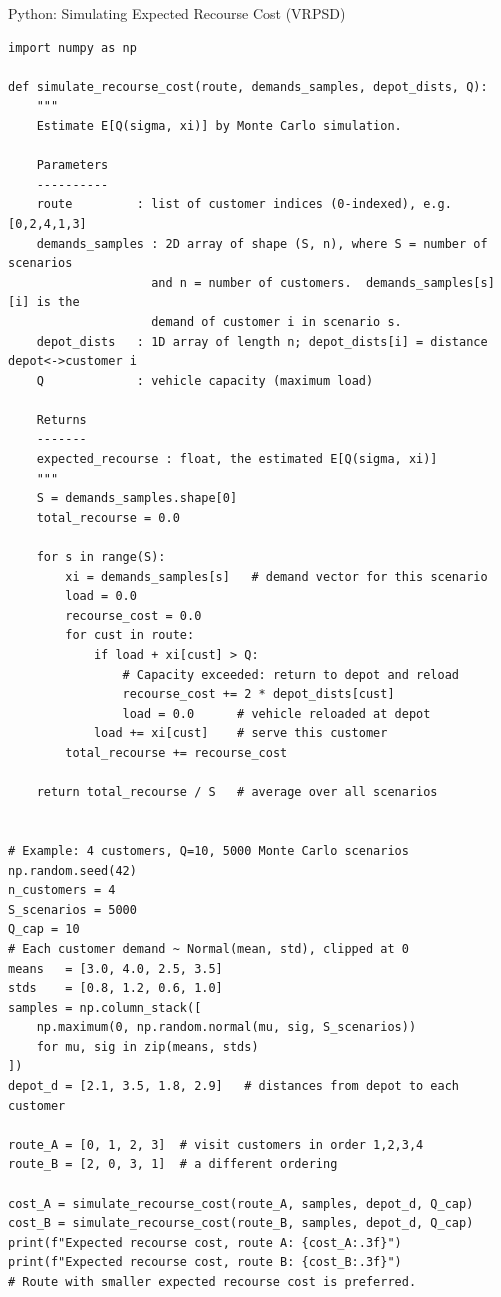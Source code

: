 \documentclass[aspectratio=169,10pt]{beamer}
\begin{document}
\begin{frame}[fragile]{Python: Simulating Expected Recourse Cost (VRPSD)}
\begin{lstlisting}
import numpy as np

def simulate_recourse_cost(route, demands_samples, depot_dists, Q):
    """
    Estimate E[Q(sigma, xi)] by Monte Carlo simulation.

    Parameters
    ----------
    route         : list of customer indices (0-indexed), e.g. [0,2,4,1,3]
    demands_samples : 2D array of shape (S, n), where S = number of scenarios
                    and n = number of customers.  demands_samples[s][i] is the
                    demand of customer i in scenario s.
    depot_dists   : 1D array of length n; depot_dists[i] = distance depot<->customer i
    Q             : vehicle capacity (maximum load)

    Returns
    -------
    expected_recourse : float, the estimated E[Q(sigma, xi)]
    """
    S = demands_samples.shape[0]
    total_recourse = 0.0

    for s in range(S):
        xi = demands_samples[s]   # demand vector for this scenario
        load = 0.0
        recourse_cost = 0.0
        for cust in route:
            if load + xi[cust] > Q:
                # Capacity exceeded: return to depot and reload
                recourse_cost += 2 * depot_dists[cust]
                load = 0.0      # vehicle reloaded at depot
            load += xi[cust]    # serve this customer
        total_recourse += recourse_cost

    return total_recourse / S   # average over all scenarios


# Example: 4 customers, Q=10, 5000 Monte Carlo scenarios
np.random.seed(42)
n_customers = 4
S_scenarios = 5000
Q_cap = 10
# Each customer demand ~ Normal(mean, std), clipped at 0
means   = [3.0, 4.0, 2.5, 3.5]
stds    = [0.8, 1.2, 0.6, 1.0]
samples = np.column_stack([
    np.maximum(0, np.random.normal(mu, sig, S_scenarios))
    for mu, sig in zip(means, stds)
])
depot_d = [2.1, 3.5, 1.8, 2.9]   # distances from depot to each customer

route_A = [0, 1, 2, 3]  # visit customers in order 1,2,3,4
route_B = [2, 0, 3, 1]  # a different ordering

cost_A = simulate_recourse_cost(route_A, samples, depot_d, Q_cap)
cost_B = simulate_recourse_cost(route_B, samples, depot_d, Q_cap)
print(f"Expected recourse cost, route A: {cost_A:.3f}")
print(f"Expected recourse cost, route B: {cost_B:.3f}")
# Route with smaller expected recourse cost is preferred.
\end{lstlisting}
\end{frame}
\end{document}
